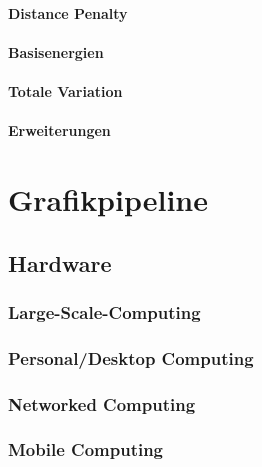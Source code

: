 \documentclass[a4paper, 11pt, accentcolor = tud3b]{tudreport}
\begin{document}
				\subsubsection{Distance Penalty} %

				\subsubsection{Basisenergien} %

				\subsubsection{Totale Variation} %

				\subsubsection{Erweiterungen} %

	\chapter{Grafikpipeline} %

		\section{Hardware} %

			\subsection{Large-Scale-Computing} %

			\subsection{Personal/Desktop Computing} %

			\subsection{Networked Computing} %

			\subsection{Mobile Computing} %
\end{document}
